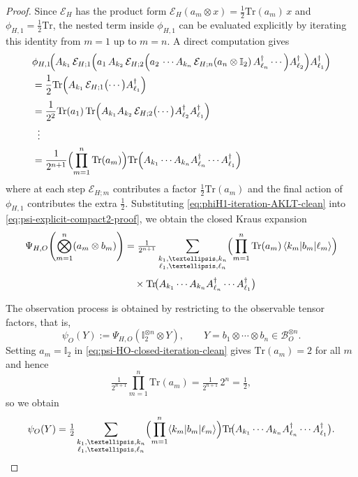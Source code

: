 \documentclass[10pt,a4paper]{amsart}
\def\Tr{\mathrm{Tr}}
\begin{document}
\begin{proof}
Since $\mathcal{E}_H$ has the product form $\mathcal{E}_H(a_m\otimes x)=\tfrac{1}{2}\Tr(a_m)\,x$ and $\phi_{H,1}=\tfrac{1}{2}\Tr$, the nested term inside $\phi_{H,1}$ can be evaluated explicitly by iterating this identity from $m=1$ up to $m=n$. A direct computation gives
\begin{align}
&\phi_{H,1}\!\Bigl(
A_{k_1}\,
\mathcal{E}_{H;1}\Bigl(
a_1\,
A_{k_2}\,
\mathcal{E}_{H;2}\Bigl(
a_2\,
\cdots
A_{k_n}\,\mathcal{E}_{H;n}(a_n\otimes\mathbb{I}_2)\,
A_{\ell_n}^\dagger
\cdots
\Bigr)
A_{\ell_2}^\dagger
\Bigr)
A_{\ell_1}^\dagger
\Bigr)\nonumber\\
&=
\frac{1}{2}\Tr\Bigl(
A_{k_1}\,
\mathcal{E}_{H;1}\bigl(\cdots\bigr)
A_{\ell_1}^\dagger
\Bigr)
\nonumber\\[0.3em]
&=
\frac{1}{2^2}\Tr(a_1)\,
\Tr\Bigl(
A_{k_1}A_{k_2}\,
\mathcal{E}_{H;2}\bigl(\cdots\bigr)
A_{\ell_2}^\dagger A_{\ell_1}^\dagger
\Bigr)
\nonumber\\
&\;\;\vdots\nonumber\\
&=
\frac{1}{2^{n+1}}
\Bigl(\prod_{m=1}^n \Tr(a_m)\Bigr)
\Tr\Bigl(
A_{k_1}\cdots A_{k_n}
A_{\ell_n}^\dagger\cdots A_{\ell_1}^\dagger
\Bigr)
\label{eq:phiH1-iteration-AKLT-clean}
\end{align}
where at each step $\mathcal{E}_{H;m}$ contributes a factor $\tfrac{1}{2}\Tr(a_m)$ and the final action of $\phi_{H,1}$ contributes the extra $\tfrac{1}{2}$.
Substituting \eqref{eq:phiH1-iteration-AKLT-clean} into \eqref{eq:psi-explicit-compact2-proof}, we obtain the closed Kraus expansion
\begin{align}
\Psi_{H,O}\!\left(\bigotimes_{m=1}^n (a_m\otimes b_m)\right)
&=
\tfrac{1}{2^{n+1}}
\sum_{\substack{k_1,\dots,k_n\\ \ell_1,\dots,\ell_n}}
\Bigl(\prod_{m=1}^{n}\Tr(a_m)\,\langle k_m|b_m|\ell_m\rangle\Bigr)
\nonumber\\[0.3em]
&\quad\times
\Tr\!\bigl(A_{k_1}\cdots A_{k_n} A_{\ell_n}^{\dagger}\cdots A_{\ell_1}^{\dagger}\bigr)
\label{eq:psi-HO-closed-iteration-clean}
\end{align}

The observation process is obtained by restricting to the observable tensor factors, that is,
\[
\psi_{O}(Y)
:=
\Psi_{H,O}(\mathbb{I}_2^{\otimes n}\otimes Y),
\qquad
Y=b_1\otimes\cdots\otimes b_n\in\mathcal{B}_O^{\otimes n}.
\]
Setting $a_m=\mathbb{I}_2$ in \eqref{eq:psi-HO-closed-iteration-clean} gives $\Tr(a_m)=2$ for all $m$ and hence
\[
\tfrac{1}{2^{n+1}}\prod_{m=1}^{n}\Tr(a_m)
=
\tfrac{1}{2^{n+1}}\,2^{n}
=
\tfrac{1}{2},
\]
so we obtain
\begin{equation}\label{eq:psi_O_closed_AKLT_final-clean}
\psi_{O}(Y)
=
\tfrac{1}{2}\sum_{\substack{k_1,\dots,k_n\\ \ell_1,\dots,\ell_n}}
\Bigl(\prod_{m=1}^{n}\langle k_m|b_m|\ell_m\rangle\Bigr)
\Tr\!\bigl(A_{k_1}\cdots A_{k_n} A_{\ell_n}^{\dagger}\cdots A_{\ell_1}^{\dagger}\bigr).
\end{equation}


\end{proof}
\end{document}
